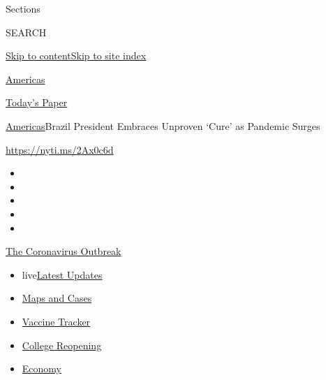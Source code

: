 Sections

SEARCH

\protect\hyperlink{site-content}{Skip to
content}\protect\hyperlink{site-index}{Skip to site index}

\href{https://www.nytimes3xbfgragh.onion/section/world/americas}{Americas}

\href{https://myaccount.nytimes3xbfgragh.onion/auth/login?response_type=cookie\&client_id=vi}{}

\href{https://www.nytimes3xbfgragh.onion/section/todayspaper}{Today's
Paper}

\href{/section/world/americas}{Americas}\textbar{}Brazil President
Embraces Unproven `Cure' as Pandemic Surges

\url{https://nyti.ms/2Ax0c6d}

\begin{itemize}
\item
\item
\item
\item
\item
\end{itemize}

\href{https://www.nytimes3xbfgragh.onion/news-event/coronavirus?action=click\&pgtype=Article\&state=default\&region=TOP_BANNER\&context=storylines_menu}{The
Coronavirus Outbreak}

\begin{itemize}
\tightlist
\item
  live\href{https://www.nytimes3xbfgragh.onion/2020/08/04/world/coronavirus-cases.html?action=click\&pgtype=Article\&state=default\&region=TOP_BANNER\&context=storylines_menu}{Latest
  Updates}
\item
  \href{https://www.nytimes3xbfgragh.onion/interactive/2020/us/coronavirus-us-cases.html?action=click\&pgtype=Article\&state=default\&region=TOP_BANNER\&context=storylines_menu}{Maps
  and Cases}
\item
  \href{https://www.nytimes3xbfgragh.onion/interactive/2020/science/coronavirus-vaccine-tracker.html?action=click\&pgtype=Article\&state=default\&region=TOP_BANNER\&context=storylines_menu}{Vaccine
  Tracker}
\item
  \href{https://www.nytimes3xbfgragh.onion/2020/08/02/us/covid-college-reopening.html?action=click\&pgtype=Article\&state=default\&region=TOP_BANNER\&context=storylines_menu}{College
  Reopening}
\item
  \href{https://www.nytimes3xbfgragh.onion/live/2020/08/04/business/stock-market-today-coronavirus?action=click\&pgtype=Article\&state=default\&region=TOP_BANNER\&context=storylines_menu}{Economy}
\end{itemize}

